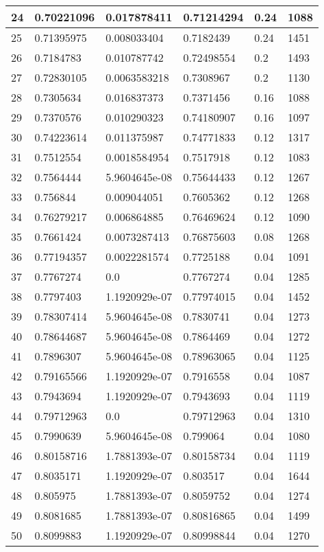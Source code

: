 \begin{longtable}{|l|l|l|l|l|l|}
24 & 0.70221096 & 0.017878411 & 0.71214294 & 0.24 & 1088 \\ \hline 
25 & 0.71395975 & 0.008033404 & 0.7182439 & 0.24 & 1451 \\ \hline 
26 & 0.7184783 & 0.010787742 & 0.72498554 & 0.2 & 1493 \\ \hline 
27 & 0.72830105 & 0.0063583218 & 0.7308967 & 0.2 & 1130 \\ \hline 
28 & 0.7305634 & 0.016837373 & 0.7371456 & 0.16 & 1088 \\ \hline 
29 & 0.7370576 & 0.010290323 & 0.74180907 & 0.16 & 1097 \\ \hline 
30 & 0.74223614 & 0.011375987 & 0.74771833 & 0.12 & 1317 \\ \hline 
31 & 0.7512554 & 0.0018584954 & 0.7517918 & 0.12 & 1083 \\ \hline 
32 & 0.7564444 & 5.9604645e-08 & 0.75644433 & 0.12 & 1267 \\ \hline 
33 & 0.756844 & 0.009044051 & 0.7605362 & 0.12 & 1268 \\ \hline 
34 & 0.76279217 & 0.006864885 & 0.76469624 & 0.12 & 1090 \\ \hline 
35 & 0.7661424 & 0.0073287413 & 0.76875603 & 0.08 & 1268 \\ \hline 
36 & 0.77194357 & 0.0022281574 & 0.7725188 & 0.04 & 1091 \\ \hline 
37 & 0.7767274 & 0.0 & 0.7767274 & 0.04 & 1285 \\ \hline 
38 & 0.7797403 & 1.1920929e-07 & 0.77974015 & 0.04 & 1452 \\ \hline 
39 & 0.78307414 & 5.9604645e-08 & 0.7830741 & 0.04 & 1273 \\ \hline 
40 & 0.78644687 & 5.9604645e-08 & 0.7864469 & 0.04 & 1272 \\ \hline 
41 & 0.7896307 & 5.9604645e-08 & 0.78963065 & 0.04 & 1125 \\ \hline 
42 & 0.79165566 & 1.1920929e-07 & 0.7916558 & 0.04 & 1087 \\ \hline 
43 & 0.7943694 & 1.1920929e-07 & 0.7943693 & 0.04 & 1119 \\ \hline 
44 & 0.79712963 & 0.0 & 0.79712963 & 0.04 & 1310 \\ \hline 
45 & 0.7990639 & 5.9604645e-08 & 0.799064 & 0.04 & 1080 \\ \hline 
46 & 0.80158716 & 1.7881393e-07 & 0.80158734 & 0.04 & 1119 \\ \hline 
47 & 0.8035171 & 1.1920929e-07 & 0.803517 & 0.04 & 1644 \\ \hline 
48 & 0.805975 & 1.7881393e-07 & 0.8059752 & 0.04 & 1274 \\ \hline 
49 & 0.8081685 & 1.7881393e-07 & 0.80816865 & 0.04 & 1499 \\ \hline 
50 & 0.8099883 & 1.1920929e-07 & 0.80998844 & 0.04 & 1270 \\ \hline 
\end{longtable}